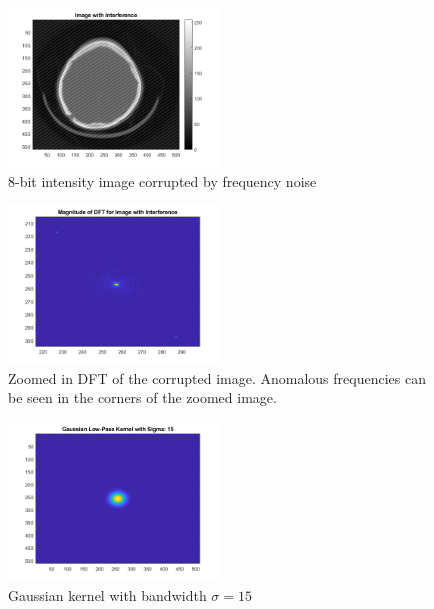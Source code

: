 \documentclass{article}[12 pt]
\begin{document}
\begin{enumerate}
\begin{center}
	\begin{figure}[H]
		\centering
		\includegraphics[width = 0.5\textwidth]{Images/interference.png}
		\caption{8-bit intensity image corrupted by frequency noise}
		\label{interference}
	\end{figure}
\end{center}
\begin{center}
	\begin{figure}[H]
		\centering
		\includegraphics[width = 0.5\textwidth]{Images/dftNoisy.png}
		\caption{Zoomed in DFT of the corrupted image.  Anomalous frequencies can be seen in the corners of the zoomed image.}
		\label{dftNoisy}
	\end{figure}
\end{center}
\begin{center}
	\begin{figure}[H]
		\centering
		\includegraphics[width = 0.5\textwidth]{Images/kernel.png}
		\caption{Gaussian kernel with bandwidth $\sigma = 15$}
		\label{kernel}

\end{figure}
\end{center}
\end{enumerate}
\end{document}
